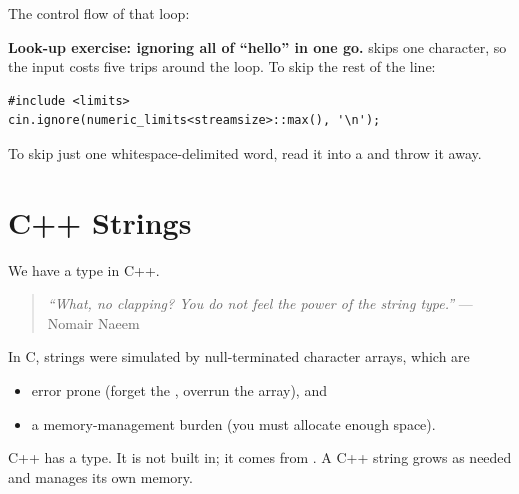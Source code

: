 The control flow of that loop:
\begin{center}
\end{center}

\begin{aside}
\textbf{Look-up exercise: ignoring all of ``hello'' in one go.} 
skips one character, so the input  costs five trips around the loop.
To skip the rest of the line:
\begin{lstlisting}[style=cpp]
#include <limits>
cin.ignore(numeric_limits<streamsize>::max(), '\n');
\end{lstlisting}
To skip just one whitespace-delimited word, read it into a  and
throw it away.
\end{aside}

\section{C++ Strings}
We have a  type in C++.

\begin{quote}
\textit{``What, no clapping? You do not feel the power of the string type.''}
--- Nomair Naeem
\end{quote}

In C, strings were simulated by null-terminated character arrays, which are
\begin{itemize}
  \item error prone (forget the , overrun the array), and
  \item a memory-management burden (you must allocate enough space).
\end{itemize}
C++ has a  type. It is not built in; it comes from
. A C++ string grows as needed and manages its own
memory.

